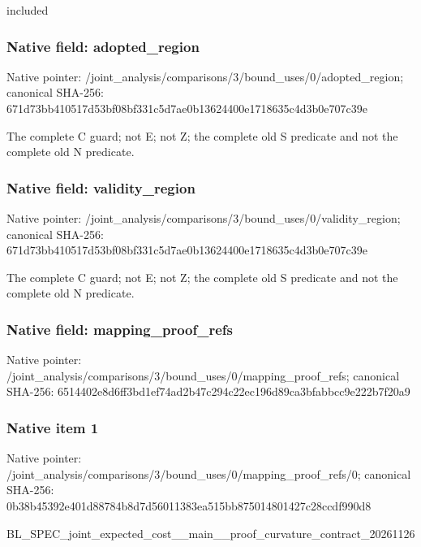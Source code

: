 \documentclass[10pt,a4paper]{article}
\begin{document}
included


\subsubsection{Native field: adopted\_region}


Native pointer: /joint\_analysis/comparis\allowbreak{}ons/3/bound\_uses/0/adopt\allowbreak{}ed\_region; canonical SHA-256: 671d73bb410517d53bf08bf3\allowbreak{}31c5d7ae0b13624400e17186\allowbreak{}35c4d3b0e707c39e


The complete C guard; not E; not Z; the complete old S predicate and not the complete old N predicate.


\subsubsection{Native field: validity\_region}


Native pointer: /joint\_analysis/comparis\allowbreak{}ons/3/bound\_uses/0/valid\allowbreak{}ity\_region; canonical SHA-256: 671d73bb410517d53bf08bf3\allowbreak{}31c5d7ae0b13624400e17186\allowbreak{}35c4d3b0e707c39e


The complete C guard; not E; not Z; the complete old S predicate and not the complete old N predicate.


\subsubsection{Native field: mapping\_proof\_refs}


Native pointer: /joint\_analysis/comparis\allowbreak{}ons/3/bound\_uses/0/mappi\allowbreak{}ng\_proof\_refs; canonical SHA-256: 6514402e8d6ff3bd1ef74ad2\allowbreak{}b47c294c22ec196d89ca3bfa\allowbreak{}bbcc9e222b7f20a9



\subsubsection{Native item 1}


Native pointer: /joint\_analysis/comparis\allowbreak{}ons/3/bound\_uses/0/mappi\allowbreak{}ng\_proof\_refs/0; canonical SHA-256: 0b38b45392e401d88784b8d7\allowbreak{}d56011383ea515bb87501480\allowbreak{}1427c28ccdf990d8


BL\_SPEC\_joint\_expected\_c\allowbreak{}ost\_\_main\_\_proof\_curvatu\allowbreak{}re\_contract\_20261126
\end{document}
